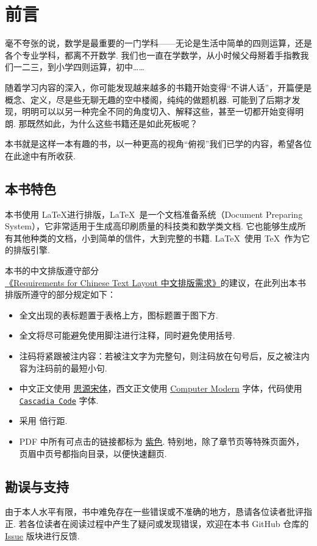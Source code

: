 \chapter{前言}

毫不夸张的说，数学是最重要的一门学科——无论是生活中简单的四则运算，还是各个专业学科，都离不开数学. 我们也一直在学数学，从小时候父母掰着手指教我们一二三，到小学四则运算，初中……

随着学习内容的深入，你可能发现越来越多的书籍开始变得“不讲人话”，开篇便是概念、定义，尽是些无聊无趣的空中楼阁，纯纯的做题机器. 可能到了后期才发现，明明可以以另一种完全不同的角度切入、解释这些，甚至一切都开始变得明朗. 那既然如此，为什么这些书籍还是如此死板呢？

本书就是这样一本有趣的书，以一种更高的视角“俯视”我们已学的内容，希望各位在此途中有所收获.

\section*{本书特色}

本书使用 \LaTeX 进行排版，\LaTeX\ 是一个文档准备系统（Document Preparing System），它非常适用于生成高印刷质量的科技类和数学类文档. 它也能够生成所有其他种类的文档，小到简单的信件，大到完整的书籍. \LaTeX\ 使用 \TeX\ 作为它的排版引擎. \cite{lshort}

本书的中文排版遵守部分\href{https://w3c.github.io/clreq}{《Requirements for Chinese Text Layout 中文排版需求》}的建议，在此列出本书排版所遵守的部分规定如下：

\begin{itemize}
  \item 全文出现的表标题置于表格上方，图标题置于图下方.
  \item 全文将尽可能避免使用脚注进行注释，同时避免使用括号.
  \item 注码将紧跟被注内容：若被注文字为完整句，则注码放在句号后，反之被注内容为注码前的最短小句.
  \item 中文正文使用 \href{https://github.com/adobe-fonts/source-han-serif}{思源宋体}，西文正文使用 \href{https://en.wikipedia.org/wiki/Computer_Modern}{Computer Modern} 字体，代码使用 \href{https://github.com/microsoft/cascadia-code}{\texttt{Cascadia Code}} 字体.
  \item 采用  倍行距.
  \item PDF 中所有可点击的链接都标为 \href{https://www.color-hex.com/color/c678dd}{紫色}. 特别地，除了章节页等特殊页面外，页眉中页号都指向目录，以便快速翻页.
\end{itemize}

\section*{勘误与支持}

由于本人水平有限，书中难免存在一些错误或不准确的地方，恳请各位读者批评指正. 若各位读者在阅读过程中产生了疑问或发现错误，欢迎在本书 GitHub 仓库的 \href{https://github.com/Cierra-Runis/math/issues}{Issue} 版块进行反馈.

\begin{flushright}
  \href{https://github.com/Cierra-Runis}{\creator} \\
  \latestdate
\end{flushright}
